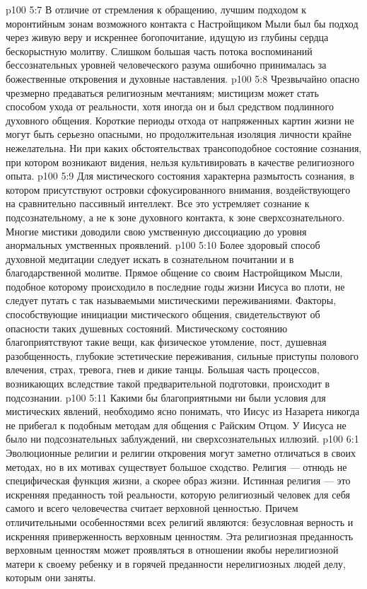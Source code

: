 \vs p100 5:7 \pc В отличие от стремления к обращению, лучшим подходом к моронтийным зонам возможного контакта с Настройщиком Мыли был бы подход через живую веру и искреннее богопочитание, идущую из глубины сердца бескорыстную молитву. Слишком большая часть потока воспоминаний бессознательных уровней человеческого разума ошибочно принималась за божественные откровения и духовные наставления.
\vs p100 5:8 Чрезвычайно опасно чрезмерно предаваться религиозным мечтаниям; мистицизм может стать способом ухода от реальности, хотя иногда он и был средством подлинного духовного общения. Короткие периоды отхода от напряженных картин жизни не могут быть серьезно опасными, но продолжительная изоляция личности крайне нежелательна. Ни при каких обстоятельствах трансоподобное состояние сознания, при котором возникают видения, нельзя культивировать в качестве религиозного опыта.
\vs p100 5:9 Для мистического состояния характерна размытость сознания, в котором присутствуют островки сфокусированного внимания, воздействующего на сравнительно пассивный интеллект. Все это устремляет сознание к подсознательному, а не к зоне духовного контакта, к зоне сверхсознательного. Многие мистики доводили свою умственную диссоциацию до уровня анормальных умственных проявлений.
\vs p100 5:10 Более здоровый способ духовной медитации следует искать в сознательном почитании и в благодарственной молитве. Прямое общение со своим Настройщиком Мысли, подобное которому происходило в последние годы жизни Иисуса во плоти, не следует путать с так называемыми мистическими переживаниями. Факторы, способствующие инициации мистического общения, свидетельствуют об опасности таких душевных состояний. Мистическому состоянию благоприятствуют такие вещи, как физическое утомление, пост, душевная разобщенность, глубокие эстетические переживания, сильные приступы полового влечения, страх, тревога, гнев и дикие танцы. Большая часть процессов, возникающих вследствие такой предварительной подготовки, происходит в подсознании.
\vs p100 5:11 Какими бы благоприятными ни были условия для мистических явлений, необходимо ясно понимать, что Иисус из Назарета никогда не прибегал к подобным методам для общения с Райским Отцом. У Иисуса не было ни подсознательных заблуждений, ни сверхсознательных иллюзий.
\vs p100 6:1 Эволюционные религии и религии откровения могут заметно отличаться в своих методах, но в их мотивах существует большое сходство. Религия --- отнюдь не специфическая функция жизни, а скорее образ жизни. Истинная религия --- это искренняя преданность той реальности, которую религиозный человек для себя самого и всего человечества считает верховной ценностью. Причем отличительными особенностями всех религий являются: безусловная верность и искренняя приверженность верховным ценностям. Эта религиозная преданность верховным ценностям может проявляться в отношении якобы нерелигиозной матери к своему ребенку и в горячей преданности нерелигиозных людей делу, которым они заняты.
